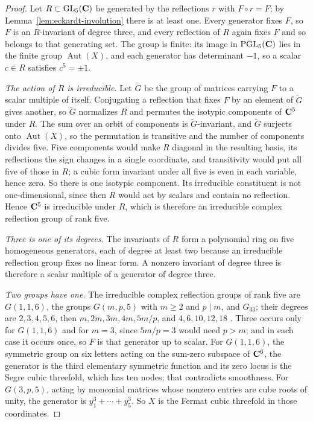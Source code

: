 \begin{proof}
Let \(R\subset\operatorname{GL}_5(\mathbf C)\) be generated by the reflections
\(r\) with \(F\circ r=F\); by Lemma~\ref{lem:eckardt-involution} there is at
least one.  Every generator fixes \(F\), so \(F\) is an \(R\)-invariant of
degree three, and every reflection of \(R\) again fixes \(F\) and so belongs
to that generating set.  The group is finite: its image in
\(\operatorname{PGL}_5(\mathbf C)\) lies in the finite group
\(\operatorname{Aut}(X)\), and each generator has determinant \(-1\), so a
scalar \(c\in R\) satisfies \(c^5=\pm1\).

\emph{The action of \(R\) is irreducible.}  Let \(\widetilde G\) be the group
of matrices carrying \(F\) to a scalar multiple of itself.  Conjugating a
reflection that fixes \(F\) by an element of \(\widetilde G\) gives another,
so \(\widetilde G\) normalizes \(R\) and permutes the isotypic components of
\(\mathbf C^5\) under \(R\).  The sum over an orbit of components is
\(\widetilde G\)-invariant, and \(\widetilde G\) surjects onto
\(\operatorname{Aut}(X)\), so the permutation is transitive and the number of
components divides five.  Five components would make \(R\) diagonal in the
resulting basis, its reflections the sign changes in a single coordinate, and
transitivity would put all five of those in \(R\); a cubic form invariant
under all five is even in each variable, hence zero.  So there is one
isotypic component.  Its irreducible constituent is not one-dimensional,
since then \(R\) would act by scalars and contain no reflection.  Hence
\(\mathbf C^5\) is irreducible under \(R\), which is therefore an irreducible complex
reflection group of rank five.

\emph{Three is one of its degrees.}  The invariants of \(R\) form a polynomial
ring on five homogeneous generators, each of degree at least two because an
irreducible reflection group fixes no linear form.  A nonzero invariant of
degree three is therefore a scalar multiple of a generator of degree three.

\emph{Two groups have one.}  The irreducible complex reflection groups of rank
five are \(G(1,1,6)\), the groups \(G(m,p,5)\) with \(m\ge2\) and \(p\mid m\),
and \(G_{33}\); their degrees are \(2,3,4,5,6\), then \(m,2m,3m,4m,5m/p\), and
\(4,6,10,12,18\) \cite{ShephardTodd}.  Three occurs only for \(G(1,1,6)\) and
for \(m=3\), since \(5m/p=3\) would need \(p>m\); and in each case it occurs
once, so \(F\) is that generator up to scalar.  For \(G(1,1,6)\), the
symmetric group on six letters acting on the sum-zero subspace of \(\mathbf C^6\),
the generator is the third elementary symmetric function and its zero locus is
the Segre cubic threefold, which has ten nodes; that contradicts smoothness.
For \(G(3,p,5)\), acting by monomial matrices whose nonzero entries are cube
roots of unity, the generator is \(y_1^3+\cdots+y_5^3\).  So \(X\) is the
Fermat cubic threefold in those coordinates.


\end{proof}
